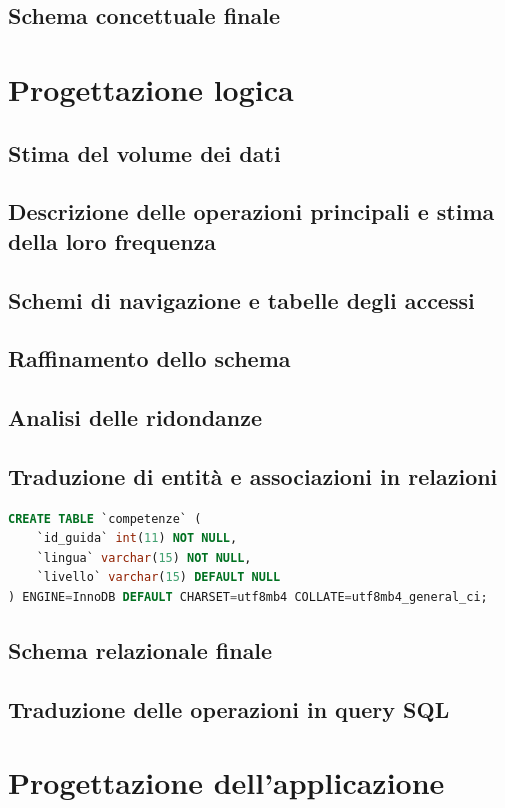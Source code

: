 \documentclass[a4paper,12pt]{report}
\begin{document}
\section{Schema concettuale finale}
\newpage
\chapter{Progettazione logica}
\section{Stima del volume dei dati}
\section{Descrizione delle operazioni principali e stima della loro frequenza}
\section{Schemi di navigazione e tabelle degli accessi}
\section{Raffinamento dello schema}
\section{Analisi delle ridondanze}
\section{Traduzione di entità e associazioni in relazioni}
\begin{lstlisting}[style=codeStyle,language=SQL]
	CREATE TABLE `competenze` (
  	`id_guida` int(11) NOT NULL,
  	`lingua` varchar(15) NOT NULL,
  	`livello` varchar(15) DEFAULT NULL
) ENGINE=InnoDB DEFAULT CHARSET=utf8mb4 COLLATE=utf8mb4_general_ci;
\end{lstlisting}

\section{Schema relazionale finale}
\section{Traduzione delle operazioni in query SQL}
\newpage
\chapter{Progettazione dell'applicazione}
\end{document}
